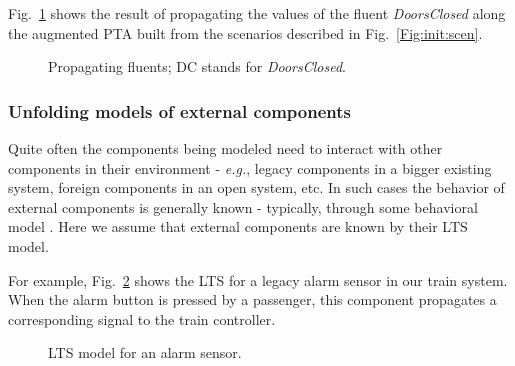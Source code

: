 Fig.~\ref{Fig:fluents} shows the result of propagating the values of the fluent \emph{DoorsClosed} along the augmented PTA built from the scenarios described in Fig.~\ref{Fig:init:scen}.

\begin{figure}
\centering
{}
\caption{Propagating fluents\label{Fig:fluents}; DC stands for \emph{DoorsClosed}.}
\end{figure}


\subsubsection*{Unfolding models of external components}

Quite often the components being modeled need to interact with other components in their environment - \textit{e.g.}, legacy components in a bigger existing system, foreign components in an open system, etc. In such cases the behavior of external components is generally known - typically, through some behavioral model \cite{Hall:2004}. Here we assume that external components are known by their LTS model. 

For example, Fig.~\ref{Fig.:alarm-sensor} shows the LTS for a legacy alarm sensor in our train system. When the alarm button is pressed by a passenger, this component propagates a corresponding signal to the train controller. 

\begin{figure}
\centering
{}
\caption{LTS model for an alarm sensor\label{Fig.:alarm-sensor}.}
\end{figure}

